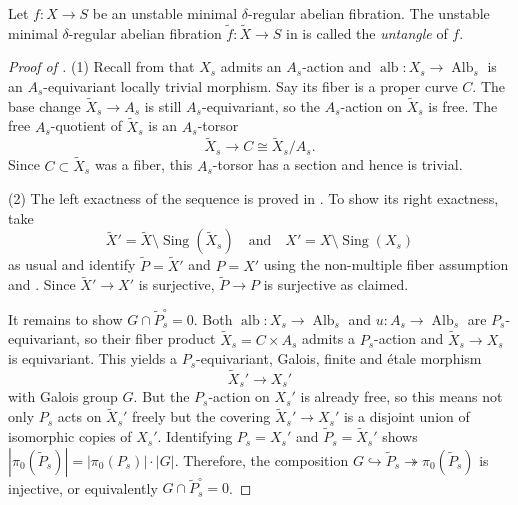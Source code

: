 \documentclass[reqno, letterpaper]{amsart}
\numberwithin{equation}{subsection}
\let\to\longrightarrow
\DeclareMathOperator{\Sing}{Sing}
\DeclareMathOperator{\Alb}{Alb}
\DeclareMathOperator{\alb}{alb}
\begin{document}
		\begin{definition}
			Let $f : X \to S$ be an unstable minimal $\delta$-regular abelian fibration. The unstable minimal $\delta$-regular abelian fibration $\tilde f : \tilde X \to S$ in  is called the \emph{untangle} of $f$.
		\end{definition}
		
		\begin{proof}[Proof of ]
			(1) Recall from  that $X_s$ admits an $A_s$-action and $\alb : X_s \to \Alb_s$ is an $A_s$-equivariant locally trivial morphism. Say its fiber is a proper curve $C$. The base change $\tilde X_s \to A_s$ is still $A_s$-equivariant, so the $A_s$-action on $\tilde X_s$ is free. The free $A_s$-quotient of $\tilde X_s$ is an $A_s$-torsor \cite[Tag~06PH]{stacks-project}
			\[ \tilde X_s \to C \cong \tilde X_s / A_s .\]
			Since $C \subset \tilde X_s$ was a fiber, this $A_s$-torsor has a section and hence is trivial.
			
			\medskip
			
			(2) The left exactness of the sequence is proved in . To show its right exactness, take
			\[ \tilde X' = \tilde X \setminus \Sing(\tilde X_s) \quad\mbox{and}\quad X' = X \setminus \Sing(X_s) \]
			as usual and identify $\tilde P = \tilde X'$ and $P = X'$ using the non-multiple fiber assumption and . Since $\tilde X' \to X'$ is surjective, $\tilde P \to P$ is surjective as claimed.
			
			It remains to show $G \cap \tilde P^\circ_s = 0$. Both $\alb : X_s \to \Alb_s$ and $u : A_s \to \Alb_s$ are $P_s$-equivariant, so their fiber product $\tilde X_s = C \times A_s$ admits a $P_s$-action and $\tilde X_s \to X_s$ is equivariant. This yields a $P_s$-equivariant, Galois, finite and \'etale morphism
			\[ \tilde X_s' \to X_s' \]
			with Galois group $G$. But the $P_s$-action on $X_s'$ is already free, so this means not only $P_s$ acts on $\tilde X_s'$ freely but the covering $\tilde X_s' \to X_s'$ is a disjoint union of isomorphic copies of $X_s'$. Identifying $P_s = X_s'$ and $\tilde P_s = \tilde X_s'$ shows $|\pi_0(\tilde P_s)| = |\pi_0(P_s)| \cdot |G|$. Therefore, the composition $G \hookrightarrow \tilde P_s \twoheadrightarrow \pi_0 (\tilde P_s)$ is injective, or equivalently $G \cap \tilde P^\circ_s = 0$.
		\end{proof}
		
		
		
\end{document}

